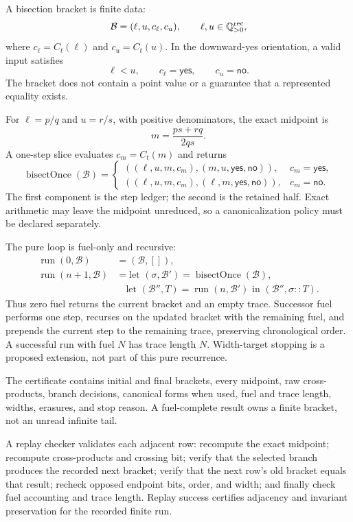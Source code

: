 A bisection bracket is finite data:
\[
 \mathcal B=(\ell,u,c_\ell,c_u),
 \qquad \ell,u\in\mathbb Q_{>0}^{\rm rec},
\]
where \(c_\ell=C_t(\ell)\) and \(c_u=C_t(u)\).  In the downward-yes orientation, a valid input satisfies
\[
                         \ell<u,\qquad c_\ell=\mathsf{yes},
                         \qquad c_u=\mathsf{no}.
\]
The bracket does not contain a point value or a guarantee that a represented equality exists.

For \(\ell=p/q\) and \(u=r/s\), with positive denominators, the exact midpoint is
\[
                         m=\frac{ps+rq}{2qs}.
\]
A one-step slice evaluates \(c_m=C_t(m)\) and returns
\[
 \operatorname{bisectOnce}(\mathcal B)=
 \begin{cases}
 ((\ell,u,m,c_m),(m,u,\mathsf{yes},\mathsf{no})),&c_m=\mathsf{yes},\\
 ((\ell,u,m,c_m),(\ell,m,\mathsf{yes},\mathsf{no})),&c_m=\mathsf{no}.
 \end{cases}
\]
The first component is the step ledger; the second is the retained half.  Exact arithmetic may leave the midpoint
unreduced, so a canonicalization policy must be declared separately.

The pure loop is fuel-only and recursive:
\[
\begin{aligned}
 \operatorname{run}(0,\mathcal B)&=(\mathcal B,[]),\\
 \operatorname{run}(n+1,\mathcal B)&=
 \text{let }(\sigma,\mathcal B')=\operatorname{bisectOnce}(\mathcal B),\\
 &\quad\text{let }(\mathcal B'',T)=\operatorname{run}(n,\mathcal B')
 \text{ in }(\mathcal B'',\sigma::T).
\end{aligned}
\]
Thus zero fuel returns the current bracket and an empty trace.  Successor fuel performs one step, recurses on the
updated bracket with the remaining fuel, and prepends the current step to the remaining trace, preserving chronological
order.  A successful run with fuel \(N\) has trace length \(N\).  Width-target stopping is a proposed extension, not
part of this pure recurrence.

The certificate contains initial and final brackets, every midpoint, raw cross-products, branch decisions, canonical
forms when used, fuel and trace length, widths, erasures, and stop reason.  A fuel-complete result owns a finite bracket,
not an unread infinite tail.

A replay checker validates each adjacent row: recompute the exact midpoint; recompute cross-products and crossing bit;
verify that the selected branch produces the recorded next bracket; verify that the next row's old bracket equals that
result; recheck opposed endpoint bits, order, and width; and finally check fuel accounting and trace length.  Replay
success certifies adjacency and invariant preservation for the recorded finite run.

